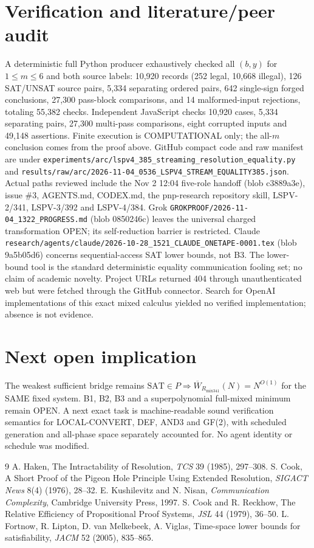 \documentclass[11pt]{article}
\begin{document}
\section*{Verification and literature/peer audit}
A deterministic full Python producer exhaustively checked all $(b,y)$ for $1\le m\le6$ and both source labels: 10,920 records (252 legal, 10,668 illegal), 126 SAT/UNSAT source pairs, 5,334 separating ordered pairs, 642 single-sign forged conclusions, 27,300 pass-block comparisons, and 14 malformed-input rejections, totaling 55,382 checks. Independent JavaScript checks 10,920 cases, 5,334 separating pairs, 27,300 multi-pass comparisons, eight corrupted inputs and 49,148 assertions. Finite execution is COMPUTATIONAL only; the all-$m$ conclusion comes from the proof above. GitHub compact code and raw manifest are under \texttt{experiments/arc/lspv4\_385\_streaming\_resolution\_equality.py} and \texttt{results/raw/arc/2026-11-04\_0536\_LSPV4\_STREAM\_EQUALITY385.json}.
Actual paths reviewed include the Nov 2 12:04 five-role handoff (blob c3889a3e), issue \#3, AGENTS.md, CODEX.md, the pnp-research repository skill, LSPV-2/341, LSPV-3/392 and LSPV-4/384. Grok \texttt{GROKPROOF/2026-11-04\_1322\_PROGRESS.md} (blob 0850246c) leaves the universal charged transformation OPEN; its self-reduction barrier is restricted. Claude \texttt{research/agents/claude/2026-10-28\_1521\_CLAUDE\_ONETAPE-0001.tex} (blob 9a5b05d6) concerns sequential-access SAT lower bounds, not B3. The lower-bound tool is the standard deterministic equality communication fooling set; no claim of academic novelty. Project URLs returned 404 through unauthenticated web but were fetched through the GitHub connector. Search for OpenAI implementations of this exact mixed calculus yielded no verified implementation; absence is not evidence.
\section*{Next open implication}
The weakest sufficient bridge remains $\mathrm{SAT}\in P\Rightarrow \overline W_{R_{\mathrm{mix341}}}(N)=N^{O(1)}$ for the SAME fixed system. B1, B2, B3 and a superpolynomial full-mixed minimum remain OPEN. A next exact task is machine-readable sound verification semantics for LOCAL-CONVERT, DEF, AND3 and GF(2), with scheduled generation and all-phase space separately accounted for. No agent identity or schedule was modified.
\begin{thebibliography}{9}
 A. Haken, The Intractability of Resolution, \emph{TCS} 39 (1985), 297--308.
 S. Cook, A Short Proof of the Pigeon Hole Principle Using Extended Resolution, \emph{SIGACT News} 8(4) (1976), 28--32.
 E. Kushilevitz and N. Nisan, \emph{Communication Complexity}, Cambridge University Press, 1997.
 S. Cook and R. Reckhow, The Relative Efficiency of Propositional Proof Systems, \emph{JSL} 44 (1979), 36--50.
 L. Fortnow, R. Lipton, D. van Melkebeek, A. Viglas, Time-space lower bounds for satisfiability, \emph{JACM} 52 (2005), 835--865.
\end{thebibliography}
\end{document}
